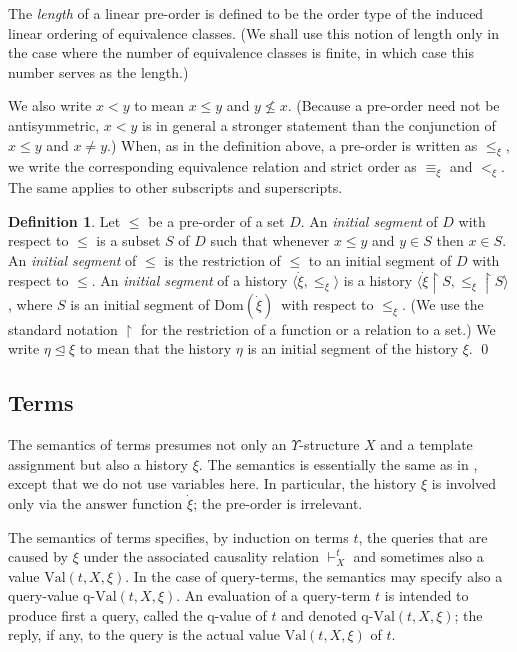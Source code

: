 \documentclass{LMCS}
\theoremstyle{definition}
\newtheorem{df}[thm]{Definition}
\newcommand{\U}{\Upsilon}
\newcommand{\ans}{\dot}
\newcommand{\dom}[1]{\ensuremath{{\text{Dom}}(#1)}}
\newcommand{\initeq}{\unlhd}
\newcommand{\qval}[3]{\ensuremath{\text{q-Val}(#1,#2,#3)}}
\newcommand{\restr}{\mathop{\upharpoonright}}
\newcommand{\sq}[1]{\ensuremath{\langle#1\rangle}}
\newcommand{\val}[3]{\ensuremath{\text{Val}(#1,#2,#3)}}
\begin{document}
The \emph{length} of a linear pre-order is defined to be the order
type of the induced linear ordering of equivalence classes.  (We
shall use this notion of length only in the case where the number of
equivalence classes is finite, in which case this number serves as
the length.)

We also write $x<y$ to mean $x\leq y$ and $y\not\leq x$.  (Because a
pre-order need not be antisymmetric, $x<y$ is in general a stronger
statement than the conjunction of $x\leq y$ and $x\neq y$.)  When,
as in the definition above, a pre-order is written as $\leq_\xi$, we
write the corresponding equivalence relation and strict order as
$\equiv_\xi$ and $<_\xi$.  The same applies to other subscripts and
superscripts.

\begin{df}
Let $\leq$ be a pre-order of a set $D$.  An \emph{initial segment}
of $D$ with respect to $\leq$ is a subset $S$ of $D$ such that
whenever $x\leq y$ and $y\in S$ then $x\in S$.  An \emph{initial
segment} of $\leq$ is the restriction of $\leq$ to an initial
segment of $D$ with respect to $\leq$.  An \emph{initial segment} of
a history \sq{{\ans\xi},\leq_\xi} is a history \sq{{\ans\xi}\restr
S,\leq_\xi\restr S}, where $S$ is an initial segment of
\dom{\ans\xi}\ with respect to $\leq_\xi$.  (We use the standard
notation $\restr$ for the restriction of a function or a relation to
a set.)  We write $\eta\initeq\xi$ to mean that the history $\eta$
is an initial segment of the history $\xi$. \qed\end{df}


\subsection{Terms}

The semantics of terms presumes not only an $\U$-structure $X$ and a
template assignment but also a history $\xi$.  The semantics is
essentially the same as in \cite{oa2}, except that we do not use variables
here.  In particular, the history $\xi$ is involved only via the answer
function $\ans\xi$; the pre-order is irrelevant.

The semantics of terms specifies, by induction on terms $t$, the queries
that are caused by $\xi$ under the associated causality relation
$\vdash^t_X$ and sometimes also a value $\val tX\xi$.  In the case of
query-terms, the semantics may specify also a query-value $\qval tX\xi$.
An evaluation of a query-term $t$ is intended to produce first a query,
called the q-value of $t$ and denoted $\qval tX\xi$; the reply, if any, to
the query is the actual value $\val tX\xi$ of $t$.
\end{document}
